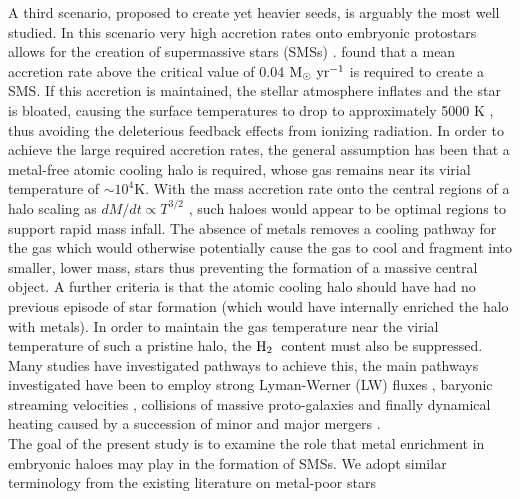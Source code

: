 \documentclass[twocolumn,iop,revtex4]{openjournal}
\newcommand{\msolaryr} {$\rm{M_{\odot}~yr^{-1}}~$}
\newcommand{\molH} {$\rm{H_2}$~}
\begin{document}
\indent A third scenario, proposed to create yet heavier seeds, is arguably the most well studied.
In this scenario very high accretion rates onto embryonic protostars allows for the creation of supermassive stars (SMSs)
\citep{Shapiro_1979, Begelman_2008, Schleicher_2013, Hosokawa_2013, Inayoshi_2014, Sakurai_2016,
  Umeda_2016, Haemmerle_2017,Woods_2017, Woods_2018, Regan_2018b}. \cite{Sakurai_2016} found
that a mean accretion rate above the critical value of 0.04 \msolaryr is required to create a SMS.
If this accretion is maintained, the stellar atmosphere inflates and the star is bloated,
causing the surface temperatures to drop to approximately 5000 K \citep{Hosokawa_2013, Woods_2017, Haemmerle_2017},
thus avoiding the deleterious feedback effects from ionizing radiation.
In order to achieve the large required accretion rates, the general assumption has been
that a metal-free atomic cooling halo is required, whose gas remains near its virial temperature of $\sim10^4$K.
With the mass accretion rate onto the central regions of a halo scaling as $dM/dt \propto T^{3/2}$ \citep{Shu_1977}, such haloes would appear
to be optimal regions to support rapid mass infall. The absence of metals removes a cooling pathway for
the gas which would otherwise potentially cause the gas to cool and fragment into smaller, lower
mass, stars thus preventing the formation of a massive central object. A further criteria is that the
atomic cooling halo should have had no previous episode of star formation (which would have
internally enriched the halo with metals). In order to maintain the gas temperature near the virial temperature of such a pristine halo, the \molH content
must also be suppressed. Many studies have investigated pathways to achieve this, the main pathways
investigated have been to employ strong Lyman-Werner (LW) fluxes \citep{Dijkstra_2008, Shang_2010,
  Regan_2014b, Latif_2014b, Agarwal_2015a, Latif_2015, Regan_2016a, Regan_2017, Regan_2018a},
baryonic streaming velocities
\citep{Tseliakhovich_2010, Tanaka_2014, Hirano_2017, Schauer_2017}, collisions of massive
proto-galaxies \citep{Mayer_2010, Mayer_2014, Inayoshi_2015} and finally dynamical heating caused
by a succession of minor and major mergers \citep{Yoshida_2003a, Fernandez_2014, Wise_2019}. \\
\indent The goal of the present study is to examine the role that metal enrichment in embryonic haloes may play in the
formation of SMSs. We adopt similar terminology from the existing literature on metal-poor stars \citep[e.g.][]{Frebel_2015}
\end{document}
